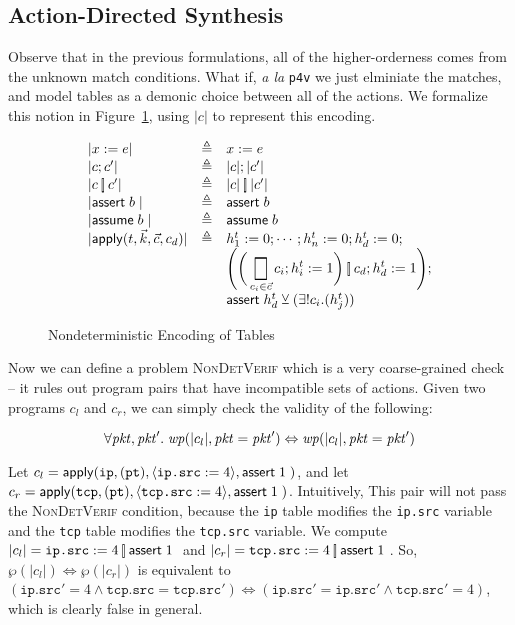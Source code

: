 

\subsection{Action-Directed Synthesis}

Observe that in the previous formulations, all of the higher-orderness
comes from the unknown match conditions. What if, \emph{a la} \texttt{p4v} we
just elminiate the matches, and model tables as a demonic choice
between all of the actions. We formalize this notion in
Figure~\ref{fig:nondeterministic}, using $|c|$ to represent this
encoding.

\begin{figure}[ht]
  \[\begin{array}{l >{\triangleq}c l}
      |x := e| && x := e  \\
      |c;c'| && |c|;|c'| \\
      |c \angel c'| && |c|\angel |c'| \\
      |\assert b | && \assert b \\
      |\assume b | && \assume b \\
      |\apply {t, \vec k, \vec{c}, c_d}| && h_1^t := 0; \cdots ; h_n^t := 0; h_d^t := 0; \\
      \multicolumn 2 l {} & \Bigg(\bigg(\displaystyle\Angel_{c_i \in \vec c} c_i; h_i^t := 1\bigg) \angel c_d; h^t_d := 1 \Bigg); \\
      \multicolumn 2 l {} & \assert {h^t_d \veebar (\exists!c_i. (h_j^t))} 
    \end{array} \]
  \caption{Nondeterministic Encoding of Tables}
  \label{fig:nondeterministic}
\end{figure}

Now we can define a problem \textsc{NonDetVerif} which is a very
coarse-grained check -- it rules out program pairs that have
incompatible sets of actions. Given two programs $c_l$ and $c_r$, we
can simply check the validity of the following:

\[\forall\mathit{pkt}, \mathit{pkt}'.\; \mathit{wp}(|c_l|, \mathit{pkt} = \mathit{pkt}') \Leftrightarrow \mathit{wp}(|c_l|, \mathit{pkt} = \mathit{pkt}') \]

\begin{example}
  Let
  $c_l = \mathsf{apply}(\texttt{ip}, (\texttt{pt}), \langle \texttt{ip.src} :=
    4 \rangle , \mathsf{assert}\; 1\; )$, and let
  $c_r = \mathsf{apply}(\texttt{tcp}, (\texttt{pt}), \langle \texttt{tcp.src}
    := 4 \rangle, \mathsf{assert}\; 1\;)$. Intuitively, This pair will not
  pass the \textsc{NonDetVerif} condition, because the \texttt{ip}
  table modifies the \texttt{ip.src} variable and the \texttt{tcp}
  table modifies the \texttt{tcp.src} variable. We compute
  $|c_l| = \texttt{ip.src}:=4 \operatorname*{\left[\!\right]} \mathsf{assert}\; 1\;$ and
  $|c_r| = \texttt{tcp.src} := 4 \operatorname*{\left[\!\right]} \mathsf{assert}\; 1\;$. So,
  $\wp(|c_l|) \Leftrightarrow \wp(|c_r|)$ is equivalent to
  $(\texttt{ip.src}' = 4 \wedge \texttt{tcp.src} = \texttt{tcp.src}')
  \Leftrightarrow (\texttt{ip.src}' = \texttt{ip.src}' \wedge
  \texttt{tcp.src}' = 4)$, which is clearly false in general.
\end{example}


